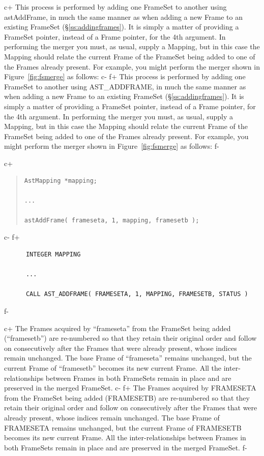 \documentclass[twoside,11pt]{article}
\newcommand{\secref}[1]{\S\ref{#1}}
\newcommand{\secref}[1]{\ref{#1}}
\begin{document}
c+
This process is performed by adding one FrameSet to another using
astAddFrame, in much the same manner as when adding a new Frame to an
existing FrameSet (\secref{ss:addingframes}). It is simply a matter of
providing a FrameSet pointer, instead of a Frame pointer, for the 4th
argument. In performing the merger you must, as usual, supply a
Mapping, but in this case the Mapping should relate the current Frame
of the FrameSet being added to one of the Frames already present. For
example, you might perform the merger shown in
Figure~\ref{fig:fsmerge} as follows:
c-
f+
This process is performed by adding one FrameSet to another using
AST\_ADDFRAME, in much the same manner as when adding a new Frame to
an existing FrameSet (\secref{ss:addingframes}). It is simply a matter
of providing a FrameSet pointer, instead of a Frame pointer, for the
4th argument. In performing the merger you must, as usual, supply a
Mapping, but in this case the Mapping should relate the current Frame
of the FrameSet being added to one of the Frames already present. For
example, you might perform the merger shown in
Figure~\ref{fig:fsmerge} as follows:
f-

c+
\begin{quote}
\small
\begin{verbatim}
AstMapping *mapping;

...

astAddFrame( frameseta, 1, mapping, framesetb );
\end{verbatim}
\normalsize
\end{quote}
c-
f+
\small
\begin{verbatim}
      INTEGER MAPPING

      ...

      CALL AST_ADDFRAME( FRAMESETA, 1, MAPPING, FRAMESETB, STATUS )
\end{verbatim}
\normalsize
f-

c+
The Frames acquired by ``frameseta'' from the FrameSet being added
(``framesetb'') are re-numbered so that they retain their original
order and follow on consecutively after the Frames that were already
present, whose indices remain unchanged. The base Frame of
``frameseta'' remains unchanged, but the current Frame of
``framesetb'' becomes its new current Frame. All the
inter-relationships between Frames in both FrameSets remain in place
and are preserved in the merged FrameSet.
c-
f+
The Frames acquired by FRAMESETA from the FrameSet being added
(FRAMESETB) are re-numbered so that they retain their original order
and follow on consecutively after the Frames that were already
present, whose indices remain unchanged. The base Frame of FRAMESETA
remains unchanged, but the current Frame of FRAMESETB becomes its new
current Frame. All the inter-relationships between Frames in both
FrameSets remain in place and are preserved in the merged FrameSet.
f-
\end{document}
